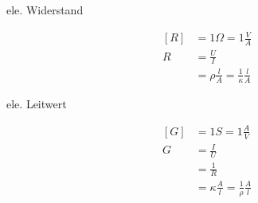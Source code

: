 \begin{boxleft}ele. Widerstand
\end{boxleft}\begin{boxrightshaded}
\begin{align}
\left[R\right]&=1\Omega=1\frac{V}{A}\\
R&=\frac{U}{I}\\
&=\rho\frac{l}{A}=\frac{1}{\kappa}\frac{l}{A}
\end{align}
\end{boxrightshaded}

\begin{boxleft}ele. Leitwert
\end{boxleft}\begin{boxrightshaded}
\begin{align}
\left[G\right]&=1S=1\frac{A}{V}\\
G&=\frac{I}{U}\\
&=\frac{1}{R}\\
&=\kappa\frac{A}{l}=\frac{1}{\rho}\frac{A}{l}
\end{align}
\end{boxrightshaded}













